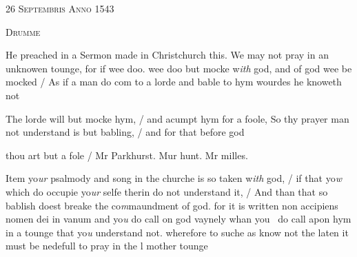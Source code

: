\documentclass[12pt, a4paper]{book}
\begin{document}
               
				\begin{center} \begin{large} {\scshape 
                  26 Septembris Anno 1543
               } \end{large} \end{center}
			
               
               	
				\begin{center}  {\scshape Drumme}  \end{center}
			

	
				\marginpar[\vspace{0.5cm}{\textcolor{Gray}{prayour in english}}]{}
			
	
				\marginpar[\vspace{0.5cm}{\textcolor{Gray}{n}}]{}
			
	
		\ifthenelse{\isodd{\thepage}}
		{\reversemarginpar}
		{\normalmarginpar}
		He preached in a Sermon made in Christchurch this.
 We may not pray in an unknowen tounge, for
 if wee doo. wee doo but mocke w\textit{ith} god, and of god
 wee be mocked / As if a man do com to a lorde
 and bable to hym wourdes he knoweth not
	
		\ifthenelse{\isodd{\thepage}}
		{\reversemarginpar}
		{\normalmarginpar}
		The lorde will but mocke hym, / and acumpt hym
		for a foole, So thy prayer man not understand
		is but babling, / and for that before god

 
 	
				\marginpar[\vspace{0.5cm}{\textcolor{Gray}{+}}]{}
			
 	
		\ifthenelse{\isodd{\thepage}}
		{\reversemarginpar}
		{\normalmarginpar}
		thou art but a fole / Mr Parkhurst. Mur hunt. Mr milles.
 	
 
  
		\ifthenelse{\isodd{\thepage}}
		{\reversemarginpar}
		{\normalmarginpar}
		Item yo\textit{ur} psalmody and song in the churche is so taken
 w\textit{ith} god, / if that yo\textit{w} which do occupie yo\textit{ur} selfe
 therin do not understand it, / And than that
 so bablish doest breake the co\textit{m}maundment of god.
 for it is written non accipiens nomen dei in vanum
 and yo\textit{u} do call on god vaynely whan you 
 do call apon hym in a tounge that yo\textit{u} understand
 not. wherefore to suche as know not the
 laten it must be nedefull to pray in the
 l mother tounge
               	
\end{document}
